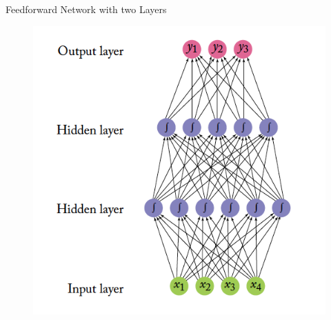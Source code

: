 \begin{frame}{Feedforward Network with two Layers}


\begin{figure}[htb]
	\centering
	 \includegraphics[scale=0.38]{pics/NN-example.png}
\end{figure}


\end{frame}



